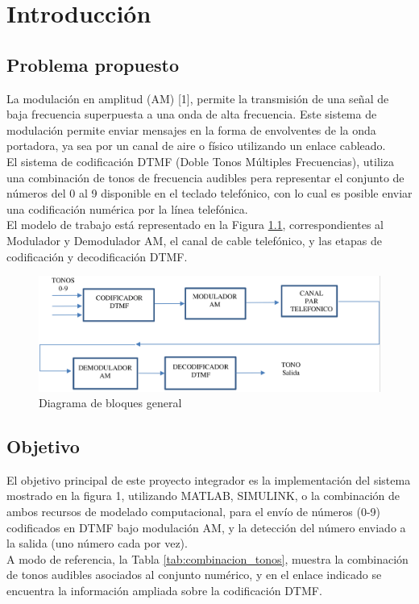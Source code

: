 \chapter{Introducción}
\section{Problema propuesto}
La modulación en amplitud (AM) [1],
permite la transmisión de una señal de
baja frecuencia superpuesta a una onda
de alta frecuencia. Este sistema de
modulación permite enviar mensajes en
la forma de envolventes de la onda
portadora, ya sea por un canal de aire o
físico utilizando un enlace cableado.\\
El sistema de codificación DTMF (Doble
Tonos Múltiples Frecuencias), utiliza una
combinación de tonos de frecuencia
audibles pera representar el conjunto de
números del 0 al 9 disponible en el
teclado telefónico, con lo cual es posible
enviar una codificación numérica por la
línea telefónica.\\
El modelo de trabajo está representado
en la Figura \ref{fig:intro_diagrama_bloques}, correspondientes al
Modulador y Demodulador AM, el canal
de cable telefónico, y las etapas de
codificación y decodificación DTMF.

\begin{figure}[ht]
  \centering
  \includegraphics[width=\linewidth]{images/intro_diagrama_general.png}
  \caption{Diagrama de bloques general}
  \label{fig:intro_diagrama_bloques}
\end{figure}

\section{Objetivo}
El objetivo principal de este proyecto
integrador es la implementación del
sistema mostrado en la figura 1,
utilizando MATLAB, SIMULINK, o la
combinación de ambos recursos de
modelado computacional, para el
envío de números (0-9) codificados
en DTMF bajo modulación AM, y la
detección del número enviado a la
salida (uno número cada por vez).\\
A modo de referencia, la Tabla \ref{tab:combinacion_tonos},
muestra la combinación de tonos
audibles asociados al conjunto
numérico, y en el enlace indicado
se encuentra la información ampliada
sobre la codificación DTMF.

